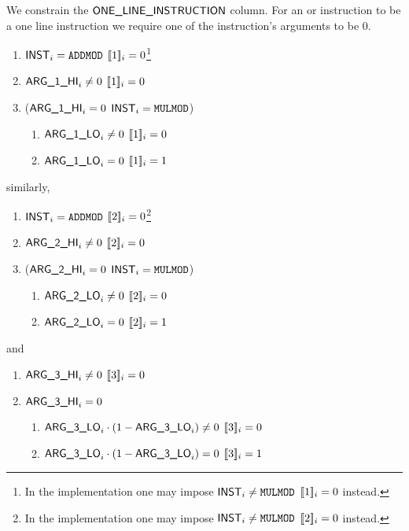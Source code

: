 We constrain the $\textsf{ONE\_LINE\_INSTRUCTION}{}$ column. For an  or  instruction to be a one line instruction we require one of the instruction's arguments to be 0.
\begin{center}
\end{center}
\begin{enumerate}
	\item \If $\textsf{INST}_{i} = \texttt{ADDMOD}$ \Then $[\![1]\!]_{i} = 0$\footnote{In the implementation one may impose \If $\textsf{INST}_{i} \neq \texttt{MULMOD}$ \Then $[\![1]\!]_{i} = 0$ instead.}
	\item \If $\textsf{ARG}\textsf{\_1}\textsf{\_HI}_{i} \neq 0$ \Then $[\![1]\!]_{i} = 0$
	\item \If \Big($\textsf{ARG}\textsf{\_1}\textsf{\_HI}_{i} = 0$ \et $\textsf{INST}_{i} = \texttt{MULMOD}$\Big) \Then
	\begin{enumerate}
		\item \If $\textsf{ARG}\textsf{\_1}\textsf{\_LO}_{i} \neq 0$ \Then $[\![1]\!]_{i} = 0$
		\item \If $\textsf{ARG}\textsf{\_1}\textsf{\_LO}_{i} =    0$ \Then $[\![1]\!]_{i} = 1$
	\end{enumerate}
\end{enumerate}
similarly, 
\begin{enumerate}
	\item \If $\textsf{INST}_{i} = \texttt{ADDMOD}$ \Then $[\![2]\!]_{i} = 0$\footnote{In the implementation one may impose \If $\textsf{INST}_{i} \neq \texttt{MULMOD}$ \Then $[\![2]\!]_{i} = 0$ instead.}
	\item \If $\textsf{ARG}\textsf{\_2}\textsf{\_HI}_{i} \neq 0$ \Then $[\![2]\!]_{i} = 0$
	\item \If \Big($\textsf{ARG}\textsf{\_2}\textsf{\_HI}_{i} = 0$ \et $\textsf{INST}_{i} = \texttt{MULMOD}$\Big) \Then
	\begin{enumerate}
		\item \If $\textsf{ARG}\textsf{\_2}\textsf{\_LO}_{i} \neq 0$ \Then $[\![2]\!]_{i} = 0$
		\item \If $\textsf{ARG}\textsf{\_2}\textsf{\_LO}_{i} = 0$    \Then $[\![2]\!]_{i} = 1$
	\end{enumerate}
\end{enumerate}
and 
\begin{enumerate}
	\item \If $\textsf{ARG}\textsf{\_3}\textsf{\_HI}_{i} \neq 0$ \Then $[\![3]\!]_{i} = 0$
	\item \If $\textsf{ARG}\textsf{\_3}\textsf{\_HI}_{i} =    0$ \Then
	\begin{enumerate}
		\item \If $\textsf{ARG}\textsf{\_3}\textsf{\_LO}_{i} \cdot (1 - \textsf{ARG}\textsf{\_3}\textsf{\_LO}_{i}) \neq 0$ \Then $[\![3]\!]_{i} = 0$
		\item \If $\textsf{ARG}\textsf{\_3}\textsf{\_LO}_{i} \cdot (1 - \textsf{ARG}\textsf{\_3}\textsf{\_LO}_{i}) = 0$ \Then $[\![3]\!]_{i} = 1$
	\end{enumerate}
\end{enumerate}
